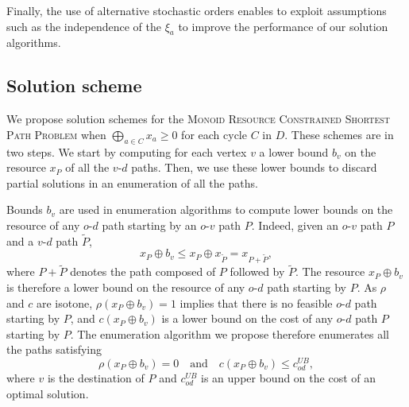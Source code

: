 \documentclass[11pt]{amsart}
\theoremstyle{plain}
\theoremstyle{remark}
\newcommand{\MRCSP}{\textsc{Monoid Resource Constrained Shortest Path Problem}\xspace}
\newcommand{\rplus}{\oplus}
\newcommand{\bigrplus}{\bigoplus}
\newcommand{\rleq}{\leqslant}
\newcommand{\rgeq}{\geqslant}
\newcommand{\rcost}{c}
\newcommand{\rmeas}{\rho}
\newcommand{\re}{x}
\begin{document}
 Finally, the use of alternative stochastic orders enables to exploit assumptions such as the independence of the $\xi_{a}$ to improve the performance of our solution algorithms. 

\subsection{Solution scheme} \label{sub:solution_scheme}


We propose solution schemes for the \MRCSP when $\bigrplus_{a\in C}x_{a} \rgeq 0$ for each cycle $C$ in $D$. These schemes are in two steps. We start by computing for each vertex $v$ a lower bound $b_{v}$ on the resource $\re_{P}$ of all the $v$-$d$ paths. Then, we use these lower bounds to discard partial solutions in an enumeration of all the paths. 

Bounds $b_{v}$ are used in enumeration algorithms to compute lower bounds on the resource of any $o$-$d$ path starting by an $o$-$v$ path $P$. Indeed, given an $o$-$v$ path $P$ and a $v$-$d$ path $\tilde{P}$, $$\re_{P}\rplus b_{v} \rleq \re_{P} \rplus \re_{\tilde{P}} = \re_{P+\tilde{P}},$$ 
where $P+\tilde{P}$ denotes the path composed of $P$ followed by $\tilde{P}$. The resource $\re_{P}\rplus b_{v}$ is therefore a lower bound on the resource of any $o$-$d$ path starting by $P$. As $\rmeas$ and $\rcost$ are isotone, $\rmeas(\re_{P}\rplus b_{v}) = 1$ implies that there is no feasible $o$-$d$ path starting by $P$, and $\rcost(\re_{P}\rplus b_{v})$ is a lower bound on the cost of any $o$-$d$ path $P$ starting by $P$. The enumeration algorithm we propose therefore enumerates all the paths satisfying
\begin{equation}\label{eq:introDP}
	\rmeas(\re_{P} \rplus b_{v}) = 0 \quad \text{and} \quad \rcost(\re_{P} \rplus b_{v}) \leq c_{od}^{UB},
\end{equation}
where $v$ is the destination of $P$ and $c_{od}^{UB}$ is an upper bound on the cost of an optimal solution.
\end{document}
